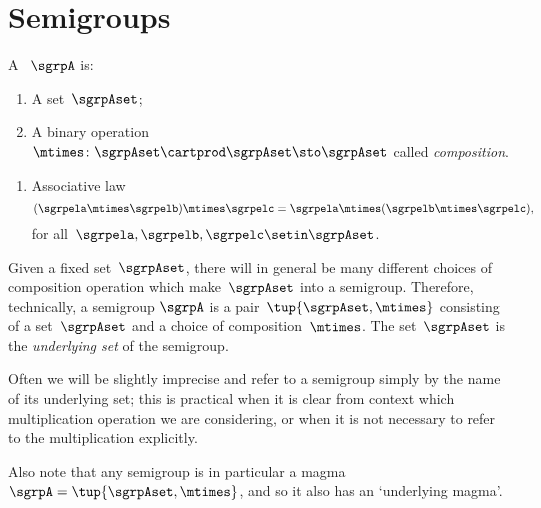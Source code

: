 
\section{Semigroups}
\label{sec:semigroups}


\begin{ctdefinition}[Semigroup]
    \label{def:semigroup}
    A \emph{}~$\sgrpA$ is:
    \begin{body}
        \constit
        \begin{enumerate}
            \item A set~$\sgrpAset$;
            \item A binary operation~$\mtimes  \colon \sgrpAset \cartprod \sgrpAset \sto \sgrpAset$ called \emph{composition}.
        \end{enumerate}
        \condit
        \begin{enumerate}
            \item Associative law
                  \begin{equation}
                      \label{eq:semigroup-associative}
                      (\sgrpela \mtimes   \sgrpelb)\mtimes   \sgrpelc
                      = \sgrpela \mtimes   (\sgrpelb \mtimes  \sgrpelc),
                  \end{equation}
                  for all~$\sgrpela , \sgrpelb, \sgrpelc \setin \sgrpAset$.
        \end{enumerate}
    \end{body}
\end{ctdefinition}

\begin{remark}
    Given a fixed set~$\sgrpAset$, there will in general be many different choices of composition operation which make~$\sgrpAset$ into a semigroup.
    Therefore, technically, a semigroup $\sgrpA$ is a pair~$\tup{\sgrpAset, \mtimes}$ consisting of a set~$\sgrpAset$ and a choice of composition~$\mtimes$.
    The set~$\sgrpAset$ is the \emph{underlying set} of the semigroup.

    Often we will be slightly imprecise and refer to a semigroup simply by the name of its underlying set;
    this is practical when it is clear from context which multiplication operation we are considering, or when it is not necessary to refer to the multiplication explicitly.

    Also note that any semigroup is in particular a magma $\sgrpA = \tup{\sgrpAset, \mtimes}$, and so it also has an `underlying magma'.
\end{remark}

